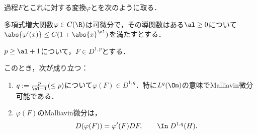 \documentclass[uplatex,dvipdfmx]{jsreport}
\begin{document}
\begin{proposition}[Malliavin微分の連鎖律]
    過程$F$とこれに対する変換$\varphi$とを次のように取る．
    \begin{enumerate}[{[A}1{]}]
        \item 多項式増大関数$\varphi\in C(\R)$は可微分で，その導関数はある$\al\ge0$について$\abs{\varphi'(x)}\le C(1+\abs{x}^\al)$を満たすとする．
        \item $p\ge\al+1$について，$F\in D^{1,p}$とする．
    \end{enumerate}
    このとき，次が成り立つ：
    \begin{enumerate}
        \item $q:=\frac{p}{\al+1}(\le p)$について$\varphi(F)\in D^{1,q}$．特に$L^q(\Om)$の意味でMalliavin微分可能である．
        \item $\varphi(F)$のMalliavin微分は，
        \[D(\varphi(F))=\varphi'(F)DF,\qquad\In\; D^{1,q}(H).\]
    \end{enumerate}
\end{proposition}
\end{document}
